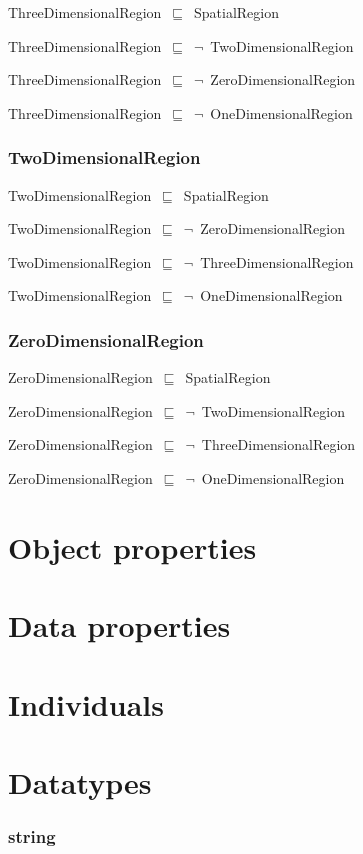 \documentclass{article}
\begin{document}
ThreeDimensionalRegion~\ensuremath{\sqsubseteq}~SpatialRegion~

ThreeDimensionalRegion~\ensuremath{\sqsubseteq}~\ensuremath{\lnot}~TwoDimensionalRegion

ThreeDimensionalRegion~\ensuremath{\sqsubseteq}~\ensuremath{\lnot}~ZeroDimensionalRegion

ThreeDimensionalRegion~\ensuremath{\sqsubseteq}~\ensuremath{\lnot}~OneDimensionalRegion

\subsubsection*{TwoDimensionalRegion}

TwoDimensionalRegion~\ensuremath{\sqsubseteq}~SpatialRegion~

TwoDimensionalRegion~\ensuremath{\sqsubseteq}~\ensuremath{\lnot}~ZeroDimensionalRegion

TwoDimensionalRegion~\ensuremath{\sqsubseteq}~\ensuremath{\lnot}~ThreeDimensionalRegion

TwoDimensionalRegion~\ensuremath{\sqsubseteq}~\ensuremath{\lnot}~OneDimensionalRegion

\subsubsection*{ZeroDimensionalRegion}

ZeroDimensionalRegion~\ensuremath{\sqsubseteq}~SpatialRegion~

ZeroDimensionalRegion~\ensuremath{\sqsubseteq}~\ensuremath{\lnot}~TwoDimensionalRegion

ZeroDimensionalRegion~\ensuremath{\sqsubseteq}~\ensuremath{\lnot}~ThreeDimensionalRegion

ZeroDimensionalRegion~\ensuremath{\sqsubseteq}~\ensuremath{\lnot}~OneDimensionalRegion

\section*{Object properties}\section*{Data properties}\section*{Individuals}\section*{Datatypes}\subsubsection*{string}
\end{document}
